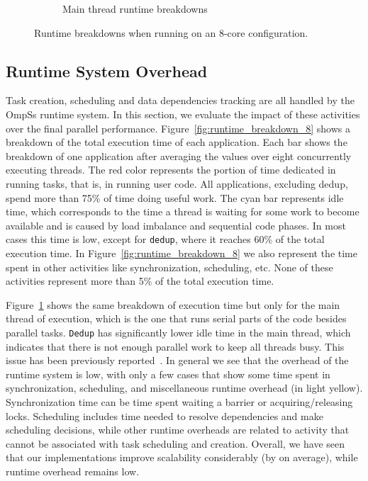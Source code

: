 \begin{figure}[p]
\begin{subfigure}{0.75\textwidth}
                \caption{Main thread runtime breakdowns}
                \label{fig:master_runtime_breakdown_8}
  \end{subfigure}
        \caption{Runtime breakdowns when running on an 8-core configuration.}
        \label{fig:runtime_breakdown}
	\vspace{.5cm}
\end{figure}



\subsection{Runtime System Overhead}
Task creation, scheduling and data dependencies tracking are all handled by the OmpSs runtime system. In this section, we evaluate the impact of these activities over the final parallel performance.
Figure~\ref{fig:runtime_breakdown_8} shows a breakdown of the total execution time of each application. 
Each bar shows the breakdown of one application after averaging the values over eight concurrently executing threads.
The red color represents the portion of time dedicated in running tasks, that is, in running user code. 
All applications, excluding dedup, spend more than 75\% of time doing useful work. 
The cyan bar represents idle time, 
which corresponds to the time a thread is waiting for some work to become available and is caused by load imbalance and sequential code phases. 
In most cases this time is low, except for \texttt{dedup},
where it reaches 60\% of the total execution time. 
In Figure~\ref{fig:runtime_breakdown_8} we also represent the time spent in other activities like synchronization, scheduling, etc. 
None of these activities represent more than 5\% of the total execution time.

Figure~\ref{fig:master_runtime_breakdown_8} shows the same breakdown of execution time but only for the main
thread of execution, which is the one that runs serial parts of the code besides parallel tasks.
\texttt{Dedup} has significantly lower idle time in the main thread, which indicates that there is not enough parallel work to keep all                                                        
threads busy.
This issue has been previously reported~\cite{Vandierendonck:2013:DSP:2503210.2503233}.
In general we see that the overhead of the runtime system is low, with only a few cases that show some time spent in synchronization, scheduling, 
and miscellaneous runtime overhead (in light yellow).
Synchronization time can be time spent waiting a barrier or acquiring/releasing locks. Scheduling includes time needed to resolve dependencies 
and make scheduling decisions, while other runtime overheads are related to activity that cannot be associated with task scheduling and creation.
Overall, we have seen that our implementations improve scalability considerably (by \AVERAGEPERF{} on average), while runtime overhead remains low.


